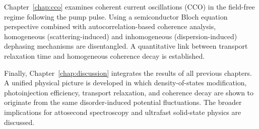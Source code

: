 Chapter~\ref{chap:cco} examines coherent current oscillations (CCO) in the field-free regime following the pump pulse. Using a semiconductor Bloch equation perspective combined with autocorrelation-based coherence analysis, homogeneous (scattering-induced) and inhomogeneous (dispersion-induced) dephasing mechanisms are disentangled. A quantitative link between transport relaxation time and homogeneous coherence decay is established.

Finally, Chapter~\ref{chap:discussion} integrates the results of all previous chapters. A unified physical picture is developed in which density-of-states modification, photoinjection efficiency, transport relaxation, and coherence decay are shown to originate from the same disorder-induced potential fluctuations. The broader implications for attosecond spectroscopy and ultrafast solid-state physics are discussed.
